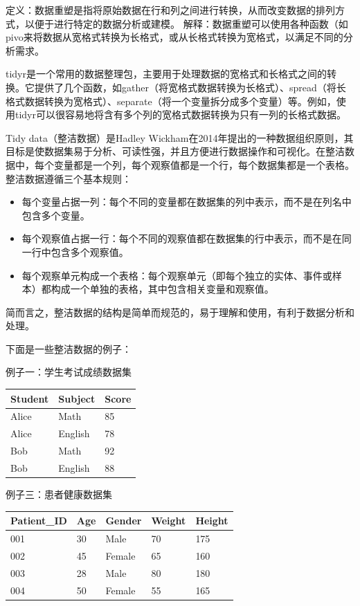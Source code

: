 \documentclass[]{book}
\begin{document}
定义：数据重塑是指将原始数据在行和列之间进行转换，从而改变数据的排列方式，以便于进行特定的数据分析或建模。
解释：数据重塑可以使用各种函数（如pivo来将数据从宽格式转换为长格式，或从长格式转换为宽格式，以满足不同的分析需求。

tidyr是一个常用的数据整理包，主要用于处理数据的宽格式和长格式之间的转换。它提供了几个函数，如gather（将宽格式数据转换为长格式）、spread（将长格式数据转换为宽格式）、separate（将一个变量拆分成多个变量）等。例如，使用tidyr可以很容易地将含有多个列的宽格式数据转换为只有一列的长格式数据。

Tidy data（整洁数据）是Hadley Wickham在2014年提出的一种数据组织原则，其目标是使数据集易于分析、可读性强，并且方便进行数据操作和可视化。在整洁数据中，每个变量都是一个列，每个观察值都是一个行，每个数据集都是一个表格。整洁数据遵循三个基本规则：

\begin{itemize}
\item
  每个变量占据一列：每个不同的变量都在数据集的列中表示，而不是在列名中包含多个变量。
\item
  每个观察值占据一行：每个不同的观察值都在数据集的行中表示，而不是在同一行中包含多个观察值。
\item
  每个观察单元构成一个表格：每个观察单元（即每个独立的实体、事件或样本）都构成一个单独的表格，其中包含相关变量和观察值。
\end{itemize}

简而言之，整洁数据的结构是简单而规范的，易于理解和使用，有利于数据分析和处理。

下面是一些整洁数据的例子：

例子一：学生考试成绩数据集

\begin{longtable}[]{@{}lll@{}}
\toprule
Student & Subject & Score\tabularnewline
\midrule
\endhead
Alice & Math & 85\tabularnewline
Alice & English & 78\tabularnewline
Bob & Math & 92\tabularnewline
Bob & English & 88\tabularnewline
\bottomrule
\end{longtable}

例子三：患者健康数据集

\begin{longtable}[]{@{}lllll@{}}
\toprule
Patient\_ID & Age & Gender & Weight & Height\tabularnewline
\midrule
\endhead
001 & 30 & Male & 70 & 175\tabularnewline
002 & 45 & Female & 65 & 160\tabularnewline
003 & 28 & Male & 80 & 180\tabularnewline
004 & 50 & Female & 55 & 165\tabularnewline
\bottomrule
\end{longtable}
\end{document}
